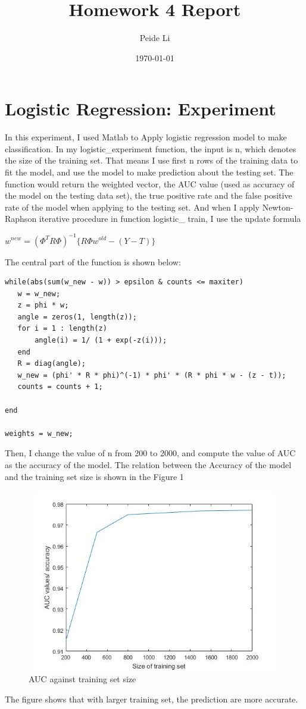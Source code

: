 \documentclass[letterpaper,12pt]{article}
\title{Homework 4 Report}
\author{Peide Li}
\date{\today}
\begin{document}
\maketitle
\section{Logistic Regression: Experiment}
In this experiment, I used Matlab to Apply logistic regression model to make classification. In my logistic\_experiment function, the input is n, which denotes the size of the training set. That means I use first n rows of the training data to fit the model, and use the model to make prediction about the testing set. The function would return the weighted vector, the AUC value (used as accuracy of the model on the testing data set), the true positive rate and the false positive rate of the model when applying to the testing set. And when I apply Newton-Raphson iterative procedure in function logistic\_ train, I use the update formula 
\begin{center}

$w^{new} = (\Phi^{T}R\Phi)^{-1} \{ R \Phi w^{old} - (Y - T) \}$

\end{center}
The central part of the function is shown below:
\begin{lstlisting}  
while(abs(sum(w_new - w)) > epsilon & counts <= maxiter)
   w = w_new;
   z = phi * w;
   angle = zeros(1, length(z));
   for i = 1 : length(z)
       angle(i) = 1/ (1 + exp(-z(i)));
   end
   R = diag(angle);
   w_new = (phi' * R * phi)^(-1) * phi' * (R * phi * w - (z - t));
   counts = counts + 1;
    
end

weights = w_new;
\end{lstlisting}  
Then, I change the value of n from 200 to 2000, and compute the value of AUC as the accuracy of the model. The relation between the Accuracy of the model and the training set size is shown in the Figure 1
\begin{center}
\begin{figure}
\includegraphics[width = 16cm, height = 8cm]{"Figure1.jpg"}
\caption{AUC against training set size}
\end{figure}
\end{center}
The figure shows that with larger training set, the prediction are more accurate.
\end{document}
